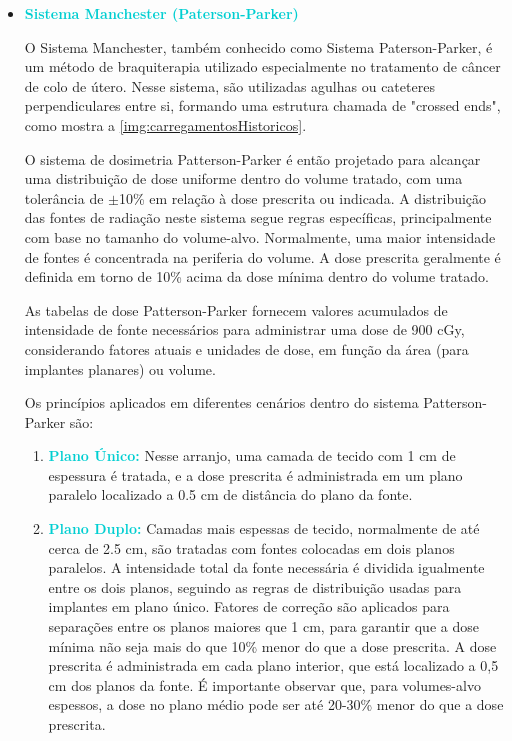 \documentclass[11pt,a4paper]{article}
\begin{document}
			\begin{itemize}
				\item \textcolor{DarkTurquoise}{\textbf{Sistema Manchester (Paterson-Parker)}}
				
				O Sistema Manchester, também conhecido como Sistema Paterson-Parker, é um método de braquiterapia utilizado especialmente no tratamento de câncer de colo de útero. Nesse sistema, são utilizadas agulhas ou cateteres perpendiculares entre si, formando uma estrutura chamada de "crossed ends", como mostra a \ref{img:carregamentosHistoricos}. 
				
				O sistema de dosimetria Patterson-Parker é então projetado para alcançar uma distribuição de dose uniforme dentro do volume tratado, com uma tolerância de $\pm$10\% em relação à dose prescrita ou indicada. A distribuição das fontes de radiação neste sistema segue regras específicas, principalmente com base no tamanho do volume-alvo. Normalmente, uma maior intensidade de fontes é concentrada na periferia do volume. A dose prescrita geralmente é definida em torno de 10\% acima da dose mínima dentro do volume tratado.

				As tabelas de dose Patterson-Parker fornecem valores acumulados de intensidade de fonte necessários para administrar uma dose de 900 cGy, considerando fatores atuais e unidades de dose, em função da área (para implantes planares) ou volume.

				Os princípios aplicados em diferentes cenários dentro do sistema Patterson-Parker são:

				\begin{enumerate}[label=\textcolor{CarnationPink}{(\roman*)}]
					\item \textcolor{DarkTurquoise}{\textbf{Plano Único:}} Nesse arranjo, uma camada de tecido com 1 cm de espessura é tratada, e a dose prescrita é administrada em um plano paralelo localizado a 0.5 cm de distância do plano da fonte.

					\item \textcolor{DarkTurquoise}{\textbf{Plano Duplo:}} Camadas mais espessas de tecido, normalmente de até cerca de 2.5 cm, são tratadas com fontes colocadas em dois planos paralelos. A intensidade total da fonte necessária é dividida igualmente entre os dois planos, seguindo as regras de distribuição usadas para implantes em plano único. Fatores de correção são aplicados para separações entre os planos maiores que 1 cm, para garantir que a dose mínima não seja mais do que 10\% menor do que a dose prescrita. A dose prescrita é administrada em cada plano interior, que está localizado a 0,5 cm dos planos da fonte. É importante observar que, para volumes-alvo espessos, a dose no plano médio pode ser até 20-30\% menor do que a dose prescrita.
					

\end{enumerate}
\end{itemize}
\end{document}
